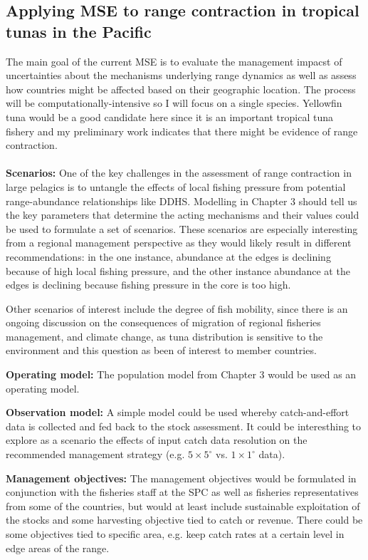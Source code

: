 \documentclass{article}
\newcommand{\griddef}[2]{$#1 \times #2^\circ$}
\begin{document}
\subsection{Applying MSE to range contraction in tropical tunas in the
  Pacific}

The main goal of the current MSE is to evaluate the management impacst of uncertainties
about the mechanisms underlying range dynamics as well as assess how
countries might be affected based on their geographic location. The
process will be computationally-intensive so I will focus on a
single species. Yellowfin tuna would be a good candidate here since it
is an important tropical tuna fishery and my preliminary work
indicates that there might be evidence of range contraction.\\
\\
\noindent\textbf{Scenarios:} One of the key challenges in the assessment of
range contraction in large pelagics is to untangle the effects of
local fishing pressure from potential range-abundance relationships
like DDHS. Modelling in Chapter 3 should tell us the key parameters
that determine the acting mechanisms and their values
could be used to formulate a set of scenarios. These scenarios are
especially interesting from a regional management perspective as they
would likely result in different recommendations: in the one
instance, abundance at the edges is declining because of high local
fishing pressure, and the other instance abundance at the edges is declining
because fishing pressure in the core is too high.

Other scenarios of interest include the degree of fish mobility, since
there is an ongoing discussion on the consequences of migration of
regional fisheries management, and climate change, as tuna
distribution is sensitive to the environment and this question as been
of interest to member countries.

\noindent\textbf{Operating model:} The population model from Chapter 3 would be
used as an operating model.

\noindent\textbf{Observation model:} A simple model could be used whereby
catch-and-effort data is collected and fed back to the stock
assessment. It could be interesthing to explore as a scenario the
effects of input catch data resolution on the recommended
management strategy (e.g. \griddef{5}{5} vs. \griddef{1}{1}
data).

\noindent\textbf{Management objectives:} The management objectives
would be formulated in conjunction with the fisheries staff at the SPC
as well as fisheries representatives from some of the countries, but
would at least include sustainable exploitation of the stocks and some
harvesting objective tied to catch or revenue. There could be some
objectives tied to specific area, e.g. keep catch rates at a certain level
 in edge areas of the range.
\end{document}
